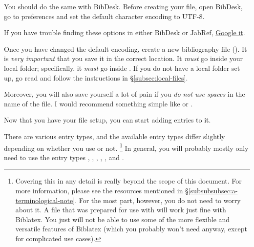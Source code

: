 You should do the same with BibDesk.
Before creating your  file, open BibDesk, go to preferences and set the default character encoding to UTF-8.

If you have trouble finding these options in either BibDesk or JabRef, \href{https://xkcd.com/627/}{Google it}. 

Once you have changed the default encoding, create a new bibliography file ().
It is \emph{very important} that you save it in the correct location.
It \emph{must} go inside your local  folder; specifically, it \emph{must} go inside .
If you do not have a local  folder set up, go read and follow the instructions in \S\ref{subsec:local-files}.

Moreover, you will also save yourself a lot of pain if you \emph{do not use spaces} in the name of the file.
I would recommend something simple like  or .

Now that you have your  file setup, you can start adding entries to it.

\label{subsubsubsec:entry-types}

There are various entry types, and the available entry types differ slightly depending on whether you use  or not.%
\footnote{%
\label{fn:entry-types-biblatex-vs-bibtex}%
Covering this in any detail is really beyond the scope of this document.
For more information, please see the resources mentioned in \S\ref{subsubsubsec:a-terminological-note}.
For the most part, however, you do not need to worry about it.
A  file that was prepared for use with  will work just fine with Biblatex.
You just will not be able to use some of the more flexible and versatile features of Biblatex (which you probably won't need anyway, except for complicated use cases).%
}
In general, you will probably mostly only need to use the entry types , , , , , and .

